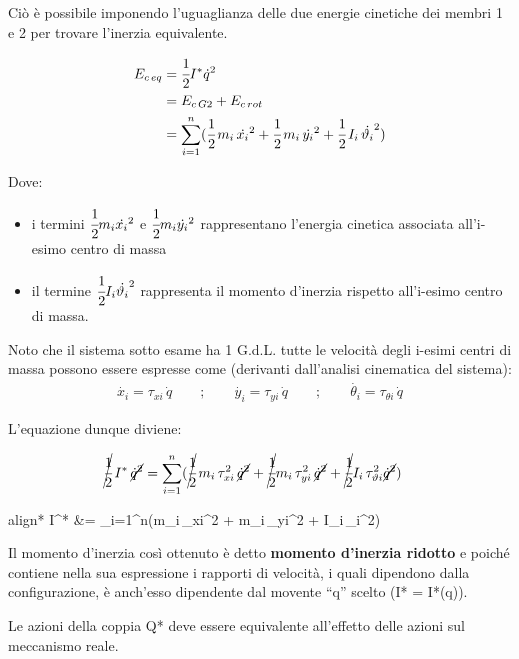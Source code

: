 	Ciò è possibile imponendo l'uguaglianza delle due energie cinetiche dei membri 1 e 2 per trovare l'inerzia equivalente.
	
	\begin{align*}
	E_{c\,eq} &= \cfrac{1}{2} I^{*} \dot{q}^2\\
	&= E_{c\,G2} + E_{c\,rot} \\
	&= \sum_{i=1}^n (\cfrac{1}{2}\,m_i\,\dot{x_i}^2 + \cfrac{1}{2}\,m_i\,\dot{y_i}^2 + \cfrac{1}{2}\,I_i\,\dot{\theta_i}^2)
	\end{align*}
	
	Dove:
	\begin{itemize}
	\item i termini $\cfrac{1}{2} m_i \dot{x_i}^2$ e $\cfrac{1}{2} m_i \dot{y_i}^2$ rappresentano l'energia cinetica associata all'i-esimo centro di massa
	\item il termine $\cfrac{1}{2} I_i\dot{\theta_i}^2$ rappresenta il momento d'inerzia rispetto all'i-esimo centro di massa. 
	\end{itemize}
	
	Noto che il sistema sotto esame ha 1 G.d.L. tutte le velocità degli i-esimi centri di massa possono essere espresse come (derivanti dall'analisi cinematica del sistema):
	\begin{gather*}
	\dot{x_i} = \tau_{xi}\,\dot{q}	\qquad;\qquad	\dot{y_i} = \tau_{yi}\,\dot{q} \qquad;\qquad \dot{\theta_i} = \tau_{\theta i}\,\dot{q}
	\end{gather*}
	
	L'equazione dunque diviene:
	
	\begin{align*}
	\cancel{\cfrac{1}{2}}\,I^{*}\,\cancel{\dot{q}^2} &= \sum_{i=1}^n (\cancel{\cfrac{1}{2}}\,m_i\,\tau_{xi}^2\,\cancel{\dot{q}^2}+\cancel{\cfrac{1}{2}}m_i\,\tau_{yi}^2\,\cancel{\dot{q}^2} + \cancel{\cfrac{1}{2}}I_i\,\tau_{\theta i}^2 \cancel{\dot{q}^2})
	\end{align*}
	
	\begin{empheq}[box=%
	\fbox]{align*}
	I^{*} &= \sum_{i=1}^n(m_i\,\tau_{xi}^2 + m_i\,\tau_{yi}^2 + I_i\,\tau_{\theta i}^2) 
	\end{empheq}
	
	Il momento d'inerzia così ottenuto è detto \textbf{momento d'inerzia ridotto} e poiché contiene nella sua espressione i rapporti di velocità, i quali dipendono dalla configurazione, è anch'esso dipendente dal movente ``q'' scelto (I* = I*(q)).
	
	Le azioni della coppia Q* deve essere equivalente all'effetto delle azioni sul meccanismo reale.
	
